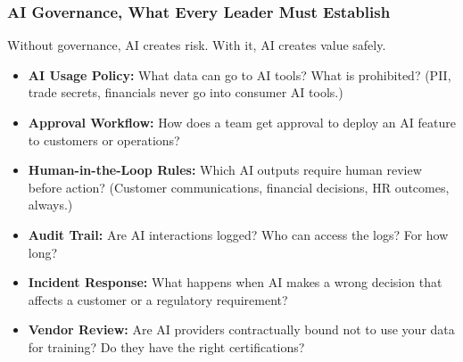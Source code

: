 \begin{frame}[fragile]\frametitle{AI Governance, What Every Leader Must Establish}

Without governance, AI creates risk. With it, AI creates value safely.

\begin{itemize}
  \item \textbf{AI Usage Policy:} What data can go to AI tools? What is prohibited? (PII, trade secrets, financials never go into consumer AI tools.)
  \item \textbf{Approval Workflow:} How does a team get approval to deploy an AI feature to customers or operations?
  \item \textbf{Human-in-the-Loop Rules:} Which AI outputs require human review before action? (Customer communications, financial decisions, HR outcomes, always.)
  \item \textbf{Audit Trail:} Are AI interactions logged? Who can access the logs? For how long?
  \item \textbf{Incident Response:} What happens when AI makes a wrong decision that affects a customer or a regulatory requirement?
  \item \textbf{Vendor Review:} Are AI providers contractually bound not to use your data for training? Do they have the right certifications?
\end{itemize}

\end{frame}


